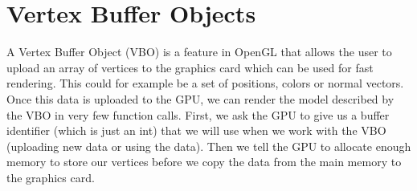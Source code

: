 \section{Vertex Buffer Objects}
\label{sec:opengl_vbo}
A Vertex Buffer Object (VBO) is a feature in OpenGL that allows the user to upload an array of vertices to the graphics card which can be used for fast rendering. This could for example be a set of positions, colors or normal vectors. Once this data is uploaded to the GPU, we can render the model described by the VBO in very few function calls. First, we ask the GPU to give us a buffer identifier (which is just an int) that we will use when we work with the VBO (uploading new data or using the data). Then we tell the GPU to allocate enough memory to store our vertices before we copy the data from the main memory to the graphics card.